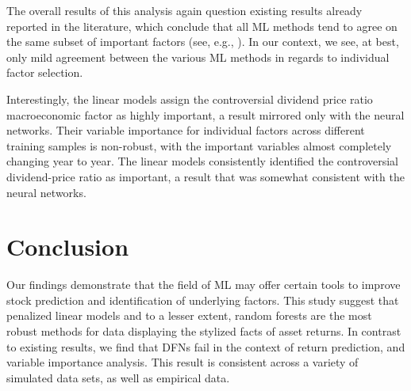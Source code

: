 \documentclass{article}
\begin{document}
The overall results of this analysis again question existing results already reported in the literature, which conclude that all ML methods tend to agree on the same subset of important factors (see, e.g., \cite{gu_empirical_2019}). In our context, we see, at best, only mild agreement between the various ML methods in regards to individual factor selection.

Interestingly, the linear models assign the controversial dividend price ratio macroeconomic factor as highly important, a result mirrored only with the neural networks. Their variable importance for individual factors across different training samples is non-robust, with the important variables almost completely changing year to year. The linear models consistently identified the controversial dividend-price ratio as important, a result that was somewhat consistent with the neural networks. 


\section{Conclusion}

Our findings demonstrate that the field of ML may offer certain tools to improve stock prediction and identification of underlying factors. This study suggest that penalized linear models and to a lesser extent, random forests are the most robust methods for data displaying the stylized facts of asset returns. In contrast to existing results, we find that DFNs fail in the context of return prediction, and variable importance analysis. This result is consistent across a variety of simulated data sets, as well as empirical data. 

\end{document}
